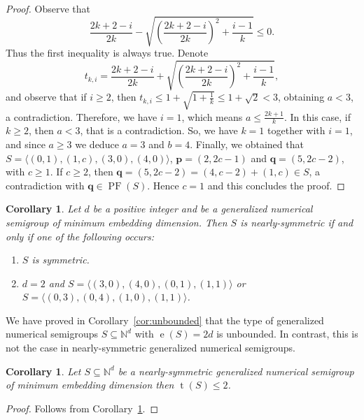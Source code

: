 \documentclass[12pt]{amsart}
\newcommand{\numberset}{\mathbb}
\newcommand{\N}{\numberset{N}}
\theoremstyle{plain}
\theoremstyle{theorem}
\newtheorem{corollary}[definition]{Corollary}
\theoremstyle{remark}
\begin{document}
\begin{proof}
	Observe that 
	$$\frac{2k+2-i}{2k}-\sqrt{\left( \frac{2k+2-i}{2k}\right)^2+\frac{i-1}{k}}\leq 0.$$ 
	Thus the first inequality is always true. Denote $$t_{k,i}=\frac{2k+2-i}{2k}+\sqrt{\left( \frac{2k+2-i}{2k}\right)^2+\frac{i-1}{k}},$$ and observe that if $i\geq 2$, then $t_{k,i}\leq 1+\sqrt{1+\frac{1}{k}}\leq 1+\sqrt{2}<3$, obtaining $a<3$, a contradiction. Therefore, we have $i=1$, which means $a\leq \frac{2k+1}{k}$. In this case, if $k\geq 2$, then $a<3$, that is a contradiction. So, we have $k=1$ together with $i=1$, and since $a\geq 3$  we deduce $a=3$ and $b=4$. Finally, we obtained that $S=\langle (0,1),(1,c),(3,0),(4,0) \rangle$, $\mathbf{p}=(2,2c-1)$ and $\mathbf{q}=(5,2c-2)$, with $c\geq 1$. If $c\geq 2$, then $\mathbf{q}=(5,2c-2)=(4,c-2)+(1,c)\in S$, a contradiction with $\mathbf{q}\in \operatorname{PF}(S)$. Hence $c=1$ and this concludes the proof.
\end{proof}

\begin{corollary}\label{cor:NS-classification}
	Let $d$ be a positive integer and be a generalized numerical semigroup of minimum embedding dimension. Then $S$ is nearly-symmetric if and only if one of the following occurs:
	\begin{enumerate}
		\item $S$ is symmetric.
		\item $d=2$ and $S=\langle (3,0), (4,0), (0,1),(1,1)\rangle$ or $S=\langle (0,3), (0,4), (1,0),(1,1)\rangle$.
	\end{enumerate} 
\end{corollary}

We have proved in Corollary~\ref{cor:unbounded} that the type of generalized numerical semigroups $S\subseteq\N^d$ with $\operatorname{e}(S)=2d$ is unbounded. In contrast, this is not the case in nearly-symmetric generalized numerical semigroups.

\begin{corollary}\label{cor:NS-type}
	Let $S \subseteq \mathbb{N}^d$ be a nearly-symmetric generalized numerical semigroup of minimum embedding dimension then $\operatorname{t}(S) \leq 2$. 
\end{corollary}
\begin{proof}
    Follows from Corollary~\ref{cor:NS-classification}.
\end{proof}






	
\end{document}
